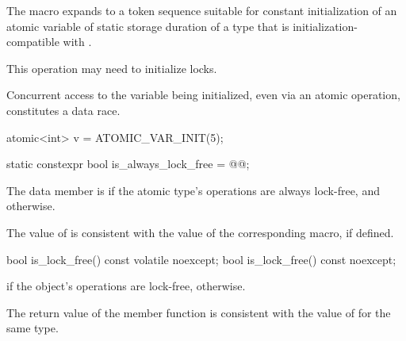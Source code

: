 \begin{itemdescr}
\pnum
The macro expands to a token sequence suitable for
constant initialization of
an atomic variable of static storage duration of a type that is
initialization-compatible with .
\begin{note} This operation may need to initialize locks. \end{note}
Concurrent access to the variable being initialized, even via an atomic operation,
constitutes a data race. \begin{example}
\begin{codeblock}
atomic<int> v = ATOMIC_VAR_INIT(5);
\end{codeblock}
\end{example}
\end{itemdescr}

%
%
%
\begin{itemdecl}
static constexpr bool is_always_lock_free = @@;
\end{itemdecl}

\begin{itemdescr}
\pnum
The  data member  is 
if the atomic type's operations are always lock-free, and  otherwise.
\begin{note}
The value of  is consistent with the value of
the corresponding  macro, if defined.
\end{note}
\end{itemdescr}

%
%
%
%
\begin{itemdecl}
bool is_lock_free() const volatile noexcept;
bool is_lock_free() const noexcept;
\end{itemdecl}

\begin{itemdescr}
\pnum
\returns {} if the object's operations are lock-free,  otherwise.
\begin{note}
The return value of the  member function
is consistent with the value of  for the same type.
\end{note}
\end{itemdescr}

